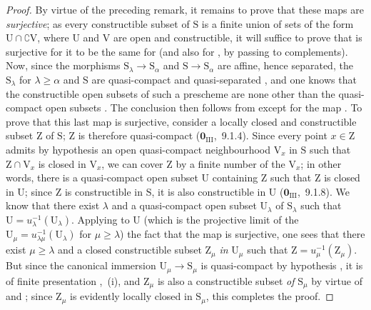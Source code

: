 \begin{proof}
By virtue of the preceding remark, it remains to prove that these maps are \emph{surjective}; as every constructible subset of $\mathrm{S}$ is a finite union of sets of the form $\mathrm{U}\cap\complement\mathrm{V}$, where $\mathrm{U}$ and $\mathrm{V}$ are open and constructible, it will suffice to prove that  is surjective for it to be the same for  (and also for , by passing to complements).
Now, since the morphisms $\mathrm{S}_\lambda\to\mathrm{S}_\alpha$ and $\mathrm{S}\to\mathrm{S}_\alpha$ are affine, hence separated, the $\mathrm{S}_\lambda$ for $\lambda\geqslant\alpha$ and $\mathrm{S}$ are quasi-compact and quasi-separated , and one knows that the constructible open subsets of such a prescheme are none other than the quasi-compact open subsets .
The conclusion then follows from  except for the map .
To prove that this last map is surjective, consider a locally closed and constructible subset $\mathrm{Z}$ of $\mathrm{S}$; $\mathrm{Z}$ is therefore quasi-compact ($\mathbf{0}_{\mathrm{III}}$,~9.1.4).
Since every point $x\in\mathrm{Z}$ admits by hypothesis an open quasi-compact neighbourhood $\mathrm{V}_x$ in $\mathrm{S}$ such that $\mathrm{Z}\cap\mathrm{V}_x$ is closed in $\mathrm{V}_x$, we can cover $\mathrm{Z}$ by a finite number of the $\mathrm{V}_x$; in other words, there is a quasi-compact open subset $\mathrm{U}$ containing $\mathrm{Z}$ such that $\mathrm{Z}$ is closed in $\mathrm{U}$; since $\mathrm{Z}$ is constructible in $\mathrm{S}$, it is also constructible in $\mathrm{U}$ ($\mathbf{0}_{\mathrm{III}}$,~9.1.8).
We know  that there exist $\lambda$ and a quasi-compact open subset $\mathrm{U}_\lambda$ of $\mathrm{S}_\lambda$ such that $\mathrm{U}=u_\lambda^{-1}(\mathrm{U}_\lambda)$.
Applying to $\mathrm{U}$ (which is the projective limit of the $\mathrm{U}_\mu=u_{\lambda\mu}^{-1}(\mathrm{U}_\lambda)$ for $\mu\geqslant\lambda$) the fact that the map  is surjective, one sees that there exist $\mu\geqslant\lambda$ and a closed constructible subset $\mathrm{Z}_\mu$ \emph{in} $\mathrm{U}_\mu$ such that $\mathrm{Z}=u_\mu^{-1}(\mathrm{Z}_\mu)$.
But since the canonical immersion $\mathrm{U}_\mu\to\mathrm{S}_\mu$ is quasi-compact by hypothesis , it is of finite presentation ,~(i), and $\mathrm{Z}_\mu$ is also a constructible subset \emph{of} $\mathrm{S}_\mu$ by virtue of  and ; since $\mathrm{Z}_\mu$ is evidently locally closed in $\mathrm{S}_\mu$, this completes the proof.
\end{proof}

